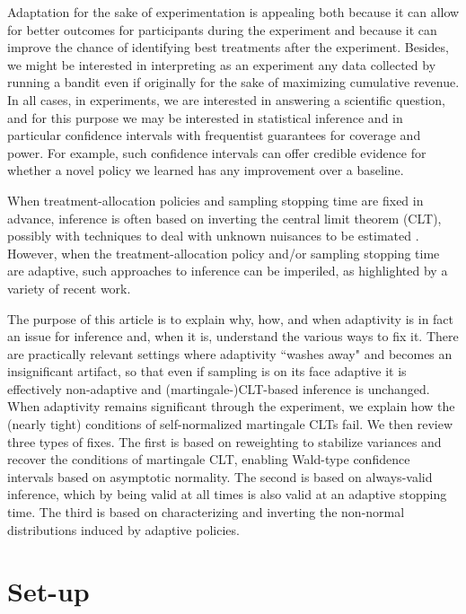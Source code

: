 Adaptation for the sake of experimentation is appealing both because it can allow for better outcomes for participants during the experiment and because it can improve the chance of identifying best treatments after the experiment. Besides, we might be interested in interpreting as an experiment any data collected by running a bandit even if originally for the sake of maximizing cumulative revenue. In all cases, in experiments, we are interested in answering a scientific question, and for this purpose we may be interested in statistical inference and in particular confidence intervals with frequentist guarantees for coverage and power. For example, such confidence intervals can offer credible evidence for whether a novel policy we learned has any improvement over a baseline.

When treatment-allocation policies and sampling stopping time are fixed in advance, inference is often based on inverting the central limit theorem (CLT), possibly with techniques to deal with unknown nuisances to be estimated \citep[\eg][]{chernozhukov2024applied}. However, when the treatment-allocation policy and/or sampling stopping time are adaptive, such approaches to inference can be imperiled, as highlighted by a variety of recent work. 

The purpose of this article is to explain why, how, and when adaptivity is in fact an issue for inference and, when it is, understand the various ways to fix it. There are practically relevant settings where adaptivity ``washes away" and becomes an insignificant artifact, so that even if sampling is on its face adaptive it is effectively non-adaptive and (martingale-)CLT-based inference is unchanged. When adaptivity remains significant through the experiment, we explain how the (nearly tight) conditions of self-normalized martingale CLTs fail. We then review three types of fixes. The first is based on reweighting to stabilize variances and recover the conditions of martingale CLT, enabling Wald-type confidence intervals based on asymptotic normality. The second is based on always-valid inference, which by being valid at all times is also valid at an adaptive stopping time. The third is based on characterizing and inverting the non-normal distributions induced by adaptive policies.

\section{Set-up}

